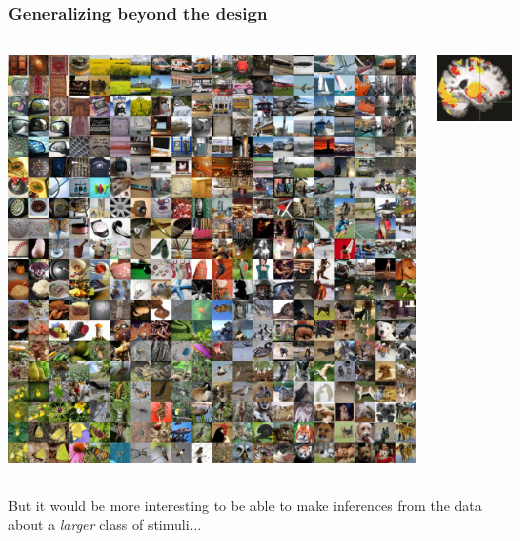 \documentclass{beamer}
\begin{document}
\begin{frame}
\frametitle{Generalizing beyond the design}

\begin{columns}
\begin{column}{0.6\textwidth}
\begin{center}
\includegraphics[scale = 0.1]{imagenet.jpg}
\end{center}
\end{column}
\begin{column}{0.4\textwidth}
\includegraphics[scale = 0.5]{smbrain2.png}
\end{column}
\end{columns}
\vspace{0.2in}
But it would be more interesting to be able to make inferences from the data about a \emph{larger} class of stimuli...

\end{frame}
\end{document}
